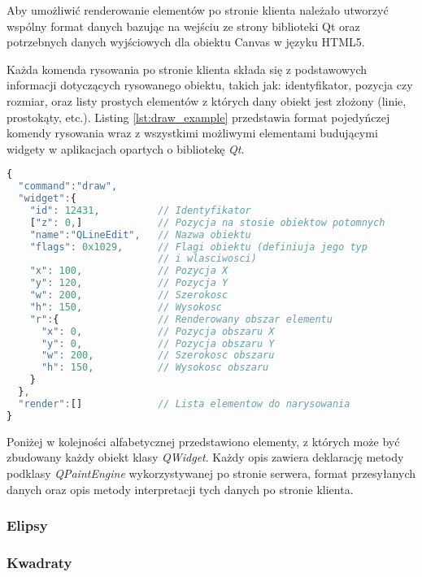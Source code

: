 
Aby umożliwić renderowanie elementów po stronie klienta należało utworzyć wspólny format danych bazując na wejściu ze strony biblioteki Qt oraz potrzebnych danych wyjściowych dla obiektu Canvas w języku HTML5. 

Każda komenda rysowania po stronie klienta składa się z podstawowych informacji dotyczących rysowanego obiektu, takich jak: identyfikator, pozycja czy rozmiar, oraz listy prostych elementów z których dany obiekt jest złożony (linie, prostokąty, etc.). Listing \ref{lst:draw_example} przedstawia format pojedyńczej komendy rysowania wraz z wszystkimi możliwymi elementami budującymi widgety w aplikacjach opartych o bibliotekę \emph{Qt}.


\begin{lstlisting}[language=JavaScript,numbers=none,caption=Komenda renderowania elementu interfejsu,label={lst:draw_example}]
{
  "command":"draw",
  "widget":{
    "id": 12431,          // Identyfikator
    ["z": 0,]             // Pozycja na stosie obiektow potomnych
    "name":"QLineEdit",   // Nazwa obiektu
    "flags": 0x1029,      // Flagi obiektu (definiuja jego typ 
                          // i wlasciwosci)
    "x": 100,             // Pozycja X
    "y": 120,             // Pozycja Y
    "w": 200,             // Szerokosc
    "h": 150,             // Wysokosc
    "r":{                 // Renderowany obszar elementu
      "x": 0,             // Pozycja obszaru X
      "y": 0,             // Pozycja obszaru Y
      "w": 200,           // Szerokosc obszaru
      "h": 150,           // Wysokosc obszaru
    }
  },
  "render":[]             // Lista elementow do narysowania
}
\end{lstlisting}

Poniżej w kolejności alfabetycznej przedstawiono elementy, z których może być zbudowany każdy obiekt klasy \emph{QWidget}. Każdy opis zawiera deklarację metody podklasy \emph{QPaintEngine} wykorzystywanej po stronie serwera, format przesyłanych danych oraz opis metody interpretacji tych danych po stronie klienta.

\subsubsection{Elipsy}


\subsubsection{Kwadraty}


